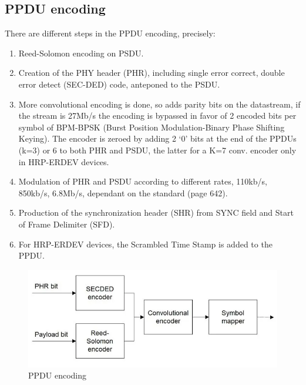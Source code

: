 \documentclass[conference]{IEEEtran}
\begin{document}
\subsection{PPDU encoding}
There are different steps in the PPDU encoding, precisely:
\begin{enumerate}
  \item Reed-Solomon encoding on PSDU.
  \item Creation of the PHY header (PHR), including single error correct, double error detect
        (SEC-DED) code, anteponed to the PSDU.
  \item More convolutional encoding is done, so adds parity bits on the datastream, if the 
        stream is 27Mb/s the encoding is bypassed in favor of 2 encoded bits per symbol of 
        BPM-BPSK (Burst Position Modulation-Binary Phase Shifting Keying). The encoder is zeroed by 
        adding 2 `0' bits at the end of the PPDUs (k=3) or 6 to both PHR and PSDU, the latter for 
        a K=7 conv. encoder only in HRP-ERDEV devices.
  \item Modulation of PHR and PSDU according to different rates, 110kb/s, 850kb/s, 6.8Mb/s, 
        dependant on the standard\cite{10794632} (page 642).
  \item Production of the synchronization header (SHR) from SYNC field and Start of Frame
        Delimiter (SFD).
  \item For HRP-ERDEV devices, the Scrambled Time Stamp is added to the PPDU.
\end{enumerate}

\begin{figure}[!h]
  \centering
  \includegraphics[width=\linewidth]{encoding}
  \caption{PPDU encoding}
  \label{fig:PPDU-encoding}
\end{figure}
\end{document}
